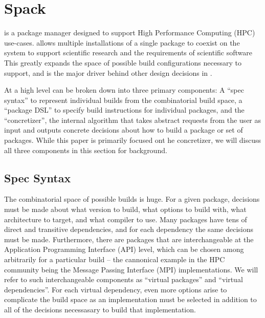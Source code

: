 \section{Spack}
\label{sec:software-model}

\spack is a package manager designed to support High Performance Computing (HPC) use-cases.
\spack allows multiple installations of a single package to coexist on the system to support scientific research and the requirements of scientific software
This greatly expands the space of possible build configurations necessary to support, and is the major driver behind other design decisions in \spack.

At a high level \spack can be broken down into three primary components: A ``spec syntax'' to represent individual builds from the combinatorial build space, a ``package DSL'' to specify build instructions for individual packages, and the ``concretizer'', the internal algorithm that takes abstract requests from the user as input and outputs concrete decisions about how to build a package or set of packages.
While this paper is primarily focused ont he concretizer, we will discuss all three components in this section for background.

\subsection{Spec Syntax}

The combinatorial space of possible \spack builds is huge.
For a given package, decisions must be made about what version to build, what options to build with, what architecture to target, and what compiler to use.
Many packages have tens of direct and transitive dependencies, and for each dependency the same decisions must be made.
Furthermore, there are packages that are interchangeable at the Application Programming Interface (API) level, which can be chosen among arbitrarily for a particular build -- the cannonical example in the HPC community being the Message Passing Interface (MPI) implementations.
We will refer to such interchangeable components as ``virtual packages'' and ``virtual dependencies''.
For each virtual dependency, even more options arise to complicate the build space as an implementation must be selected in addition to all of the decisions necessasary to build that implementation.

